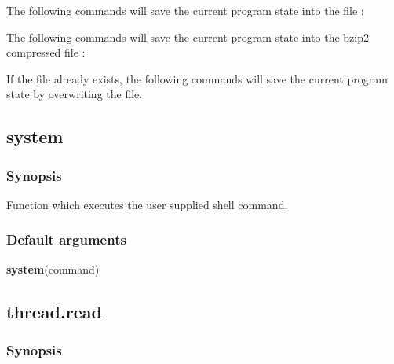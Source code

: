 The following commands will save the current program state into the file 
:





The following commands will save the current program state into the bzip2 compressed file
:







If the file 
 already exists, the following commands will save the current program
state by overwriting the file.





\newpage

\subsection{system}


\subsubsection{Synopsis}

Function which executes the user supplied shell command.

\subsubsection{Default arguments}

\textsf{\textbf{system}(command)}



\newpage

\subsection{thread.read}


\subsubsection{Synopsis}


